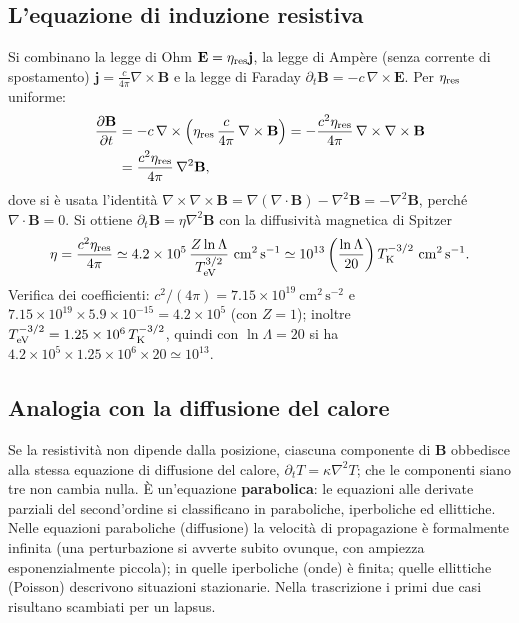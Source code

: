 \subsection{L'equazione di induzione resistiva}
Si combinano la legge di Ohm $\mathbf{E}=\eta_{\rm res}\mathbf{j}$, la legge di Amp\`ere (senza corrente di spostamento) $\mathbf{j}=\frac{c}{4\pi}\nabla\times\mathbf{B}$ e la legge di Faraday $\partial_t\mathbf{B}=-c\,\nabla\times\mathbf{E}$. Per $\eta_{\rm res}$ uniforme:
\begin{align}
\frac{\partial\mathbf{B}}{\partial t}
&=-c\,\nabla\times\left(\eta_{\rm res}\,\frac{c}{4\pi}\,\nabla\times\mathbf{B}\right)
=-\frac{c^2\eta_{\rm res}}{4\pi}\,\nabla\times\nabla\times\mathbf{B} \nonumber\\
&=\frac{c^2\eta_{\rm res}}{4\pi}\,\nabla^2\mathbf{B} ,
\end{align}
dove si è usata l'identità $\nabla\times\nabla\times\mathbf{B}=\nabla(\nabla\cdot\mathbf{B})-\nabla^2\mathbf{B}=-\nabla^2\mathbf{B}$, perché $\nabla\cdot\mathbf{B}=0$.
Si ottiene $\partial_t\mathbf{B}=\eta\nabla^2\mathbf{B}$ con la diffusività magnetica di Spitzer
\begin{equation}
\eta=\frac{c^2\eta_{\rm res}}{4\pi}\simeq4.2\times10^{5}\,\frac{Z\ln\Lambda}{T_{\rm eV}^{3/2}}\ \mathrm{cm^2\,s^{-1}}
\simeq10^{13}\left(\frac{\ln\Lambda}{20}\right)T_{\rm K}^{-3/2}\ \mathrm{cm^2\,s^{-1}} .
\end{equation}
Verifica dei coefficienti: $c^2/(4\pi)=7.15\times10^{19}\ \mathrm{cm^2\,s^{-2}}$ e $7.15\times10^{19}\times5.9\times10^{-15}=4.2\times10^{5}$ (con $Z=1$); inoltre $T_{\rm eV}^{-3/2}=1.25\times10^{6}\,T_{\rm K}^{-3/2}$, quindi con $\ln\Lambda=20$ si ha $4.2\times10^5\times1.25\times10^6\times20\simeq10^{13}$.

\subsection{Analogia con la diffusione del calore}
Se la resistività non dipende dalla posizione, ciascuna componente di $\mathbf{B}$ obbedisce alla stessa equazione di diffusione del calore, $\partial_tT=\kappa\nabla^2T$; che le componenti siano tre non cambia nulla. È un'equazione \textbf{parabolica}: le equazioni alle derivate parziali del second'ordine si classificano in paraboliche, iperboliche ed ellittiche.
Nelle equazioni paraboliche (diffusione) la velocità di propagazione è formalmente infinita (una perturbazione si avverte subito ovunque, con ampiezza esponenzialmente piccola); in quelle iperboliche (onde) è finita; quelle ellittiche (Poisson) descrivono situazioni stazionarie. Nella trascrizione i primi due casi risultano scambiati per un lapsus.

